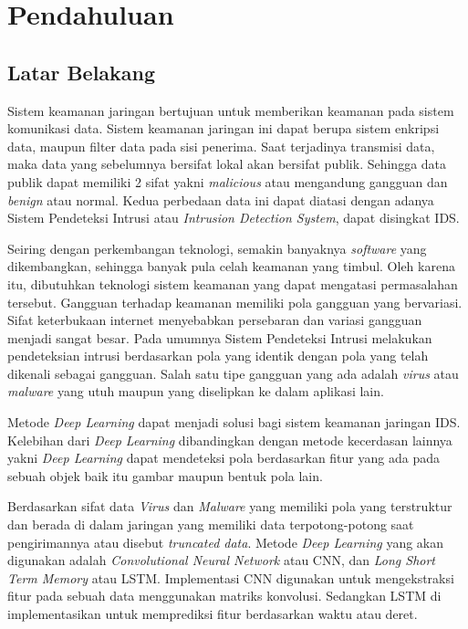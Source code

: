 \documentclass[skripsi.tex]{subfiles}
\begin{document}
\chapter{Pendahuluan}
\section{Latar Belakang} \label{latarbelakang}
\par Sistem keamanan jaringan bertujuan untuk memberikan keamanan pada sistem komunikasi data. Sistem keamanan jaringan ini dapat berupa sistem enkripsi data, maupun filter data pada sisi penerima. Saat terjadinya transmisi data, maka data yang sebelumnya bersifat lokal akan bersifat publik. Sehingga data publik dapat memiliki 2 sifat yakni  \textit{malicious} atau mengandung gangguan dan \textit{benign} atau normal. Kedua perbedaan data ini dapat diatasi dengan adanya Sistem Pendeteksi Intrusi atau \textit{Intrusion Detection System}, dapat disingkat IDS.
\par
Seiring dengan perkembangan teknologi, semakin banyaknya \textit{software} yang dikembangkan, sehingga banyak pula celah keamanan yang timbul. Oleh karena itu, dibutuhkan teknologi sistem keamanan yang dapat mengatasi permasalahan tersebut. Gangguan terhadap keamanan memiliki pola gangguan yang bervariasi. Sifat keterbukaan internet menyebabkan persebaran dan variasi gangguan menjadi sangat besar. Pada umumnya Sistem Pendeteksi Intrusi melakukan pendeteksian intrusi berdasarkan pola yang identik dengan pola yang telah dikenali sebagai gangguan. Salah satu tipe gangguan yang ada adalah \textit{virus} atau \textit{malware} yang utuh maupun yang diselipkan ke dalam aplikasi lain.
\par Metode \textit{Deep Learning} dapat menjadi solusi bagi sistem keamanan jaringan IDS. Kelebihan dari \textit{Deep Learning} dibandingkan dengan metode kecerdasan lainnya yakni \textit{Deep Learning} dapat mendeteksi pola berdasarkan fitur yang ada pada sebuah objek baik itu gambar maupun bentuk pola lain.
\par Berdasarkan sifat data \textit{Virus} dan \textit{Malware} yang memiliki pola yang terstruktur dan berada di dalam jaringan yang memiliki data terpotong-potong saat pengirimannya atau disebut \textit{truncated data}. Metode \textit{Deep Learning} yang akan digunakan adalah \textit{Convolutional Neural Network} atau CNN, dan \textit{Long Short Term Memory} atau LSTM. Implementasi CNN digunakan untuk mengekstraksi fitur pada sebuah data menggunakan matriks konvolusi. Sedangkan LSTM di implementasikan untuk memprediksi fitur berdasarkan waktu atau deret.
\end{document}
